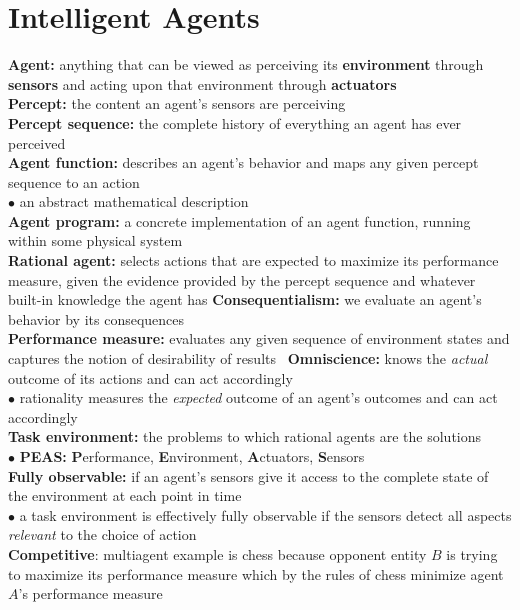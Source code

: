 \section{Intelligent Agents}

    \textbf{Agent:} anything that can be viewed as perceiving its \textbf{environment} through \textbf{sensors} and acting upon that environment through \textbf{actuators} \\
    \textbf{Percept:} the content an agent's sensors are perceiving \\
    \textbf{Percept sequence:} the complete history of everything an agent has ever perceived \\
    \textbf{Agent function:} describes an agent's behavior and maps any given percept sequence to an action \\
    $\bullet$ an abstract mathematical description \\
    \textbf{Agent program:} a concrete implementation of an agent function, running within some physical system \\
    \textbf{Rational agent:} selects actions that are expected to maximize its performance measure, given the evidence provided by the percept sequence and whatever built-in knowledge the agent has
    \textbf{Consequentialism:} we evaluate an agent's behavior by its consequences \\
    \textbf{Performance measure:} evaluates any given sequence of environment states and captures the notion of desirability of results \
    \textbf{Omniscience:} knows the \textit{actual} outcome of its actions and can act accordingly \\
    $\bullet$ rationality measures the \textit{expected} outcome of an agent's outcomes and can act accordingly \\
    \textbf{Task environment:} the problems to which rational agents are the solutions  \\
    $\bullet$ \textbf{PEAS:} \textbf{P}erformance, \textbf{E}nvironment, \textbf{A}ctuators, \textbf{S}ensors \\
    \textbf{Fully observable:} if an agent's sensors give it access to the complete state of the environment at each point in time \\
    $\bullet$ a task environment is effectively fully observable if the sensors detect all aspects \textit{relevant} to the choice of action \\
    \textbf{Competitive}: multiagent example is chess because opponent entity $B$ is trying to maximize its performance measure which by the rules of chess minimize agent $A$'s performance measure \\
